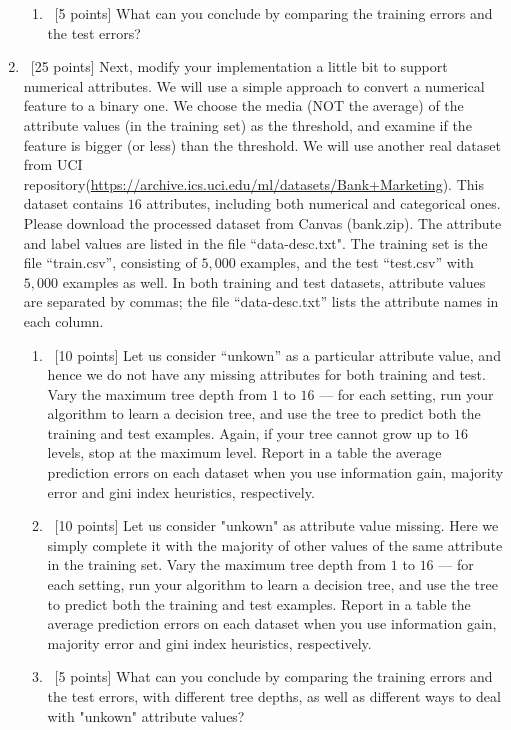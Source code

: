 \documentclass[12pt, fullpage,letterpaper]{article}
\begin{document}
\begin{enumerate}
\begin{enumerate}
\item~[5 points] What can you conclude by comparing the training errors and the test errors? 
\end{enumerate}


\item~[25 points] Next, modify your implementation a little bit to support numerical attributes. We will use a simple approach to convert a numerical feature to a binary one. We choose the media (NOT the average) of the attribute values (in the training set) as the threshold, and examine if the feature is bigger (or less) than the threshold. We will use another real dataset from UCI repository(\url{https://archive.ics.uci.edu/ml/datasets/Bank+Marketing}). This dataset contains $16$ attributes, including both numerical and categorical ones. Please download the processed dataset from Canvas (bank.zip).  The attribute and label values are listed in the file ``data-desc.txt". The training set is the file ``train.csv'', consisting of $5,000$ examples, and the test  ``test.csv'' with $5,000$ examples as well.  In both training and test datasets, attribute values are separated by commas; the file ``data-desc.txt''  lists the attribute names in each column. 
\begin{enumerate}
	\item~[10 points] Let us consider ``unkown'' as a particular attribute value, and hence we do not have any missing attributes for both training and test. Vary the maximum  tree depth from $1$ to $16$ --- for each setting, run your algorithm to learn a decision tree, and use the tree to  predict both the training  and test examples. Again, if your tree cannot grow up to $16$ levels, stop at the maximum level. Report in a table the average prediction errors on each dataset when you use information gain, majority error and gini index heuristics, respectively.
	
	\item~[10 points] Let us consider "unkown" as  attribute value missing. Here we simply complete it with the majority of other values of the same attribute in the training set.   Vary the maximum  tree depth from $1$ to $16$ --- for each setting, run your algorithm to learn a decision tree, and use the tree to  predict both the training  and test examples. Report in a table the average prediction errors on each dataset when you use information gain, majority error and gini index heuristics, respectively.
	
	
	\item~[5 points] What can you conclude by comparing the training errors and the test errors, with different tree depths, as well as different ways to deal with "unkown" attribute values?
\end{enumerate}
\end{enumerate}
\end{document}

